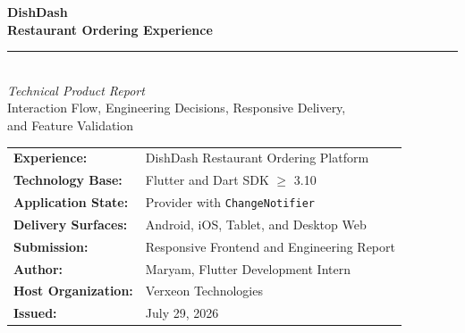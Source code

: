 \documentclass[11pt,a4paper]{article}
\begin{document}
\hypersetup{pageanchor=false}

\begin{titlepage}
    \centering
    \vspace*{1.0cm}
    
    {\Huge \bfseries DishDash} \\[0.4cm]
    {\Large \textbf{Restaurant Ordering Experience}} \\[0.6cm]
    
    \rule{\linewidth}{1.5pt} \\[1.2cm]
    
    {\Large \textit{Technical Product Report}} \\[0.3cm]
    {\large Interaction Flow, Engineering Decisions, Responsive Delivery, \\ and Feature Validation} \\[2.0cm]
    
    \vfill
    
    \begin{tcolorbox}[colback=white, colframe=black, width=\linewidth, arc=4pt, boxrule=1.2pt]
        \vspace{2mm}
        \small
        \begin{tabularx}{\linewidth}{@{}l X@{}}
            \textbf{Experience:} & DishDash Restaurant Ordering Platform \\[3pt]
            \textbf{Technology Base:} & Flutter and Dart SDK $\ge$ 3.10 \\[3pt]
            \textbf{Application State:} & Provider with \texttt{ChangeNotifier} \\[3pt]
            \textbf{Delivery Surfaces:} & Android, iOS, Tablet, and Desktop Web \\[3pt]
            \textbf{Submission:} & Responsive Frontend and Engineering Report \\[3pt]
            \textbf{Author:} & Maryam, Flutter Development Intern \\[3pt]
            \textbf{Host Organization:} & Verxeon Technologies \\[3pt]
            \textbf{Issued:} & July 29, 2026 \\
        \end{tabularx}
        \vspace{2mm}
    \end{tcolorbox}
    
    \vspace*{0.8cm}
\end{titlepage}
\hypersetup{pageanchor=true}
\end{document}
